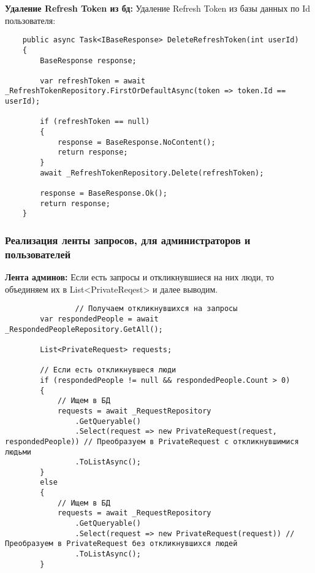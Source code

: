 \textbf{Удаление Refresh Token из бд:} Удаление Refresh Token из базы данных по Id пользователя:
\begin{verbatim}
    public async Task<IBaseResponse> DeleteRefreshToken(int userId)
    {
        BaseResponse response;

        var refreshToken = await _RefreshTokenRepository.FirstOrDefaultAsync(token => token.Id == userId);

        if (refreshToken == null)
        {
            response = BaseResponse.NoContent();
            return response;
        }
        await _RefreshTokenRepository.Delete(refreshToken);

        response = BaseResponse.Ok();
        return response;
    }
\end{verbatim}

\subsubsection{Реализация ленты запросов, для администраторов и пользователей}

\textbf{Лента админов:} Если есть запросы и откликнувшиеся на них люди, то объединяем их в List<PrivateReqest> и далее выводим.
\begin{verbatim}
				// Получаем откликнувшихся на запросы
        var respondedPeople = await _RespondedPeopleRepository.GetAll();

        List<PrivateRequest> requests;

        // Если есть откликнувшеся люди
        if (respondedPeople != null && respondedPeople.Count > 0)
        {
            // Ищем в БД
            requests = await _RequestRepository
                .GetQueryable()
                .Select(request => new PrivateRequest(request, respondedPeople)) // Преобразуем в PrivateRequest с откликнувшимися людьми
                .ToListAsync();
        }
        else
        {
            // Ищем в БД
            requests = await _RequestRepository
                .GetQueryable()
                .Select(request => new PrivateRequest(request)) // Преобразуем в PrivateRequest без откликнувшихся людей
                .ToListAsync();
        }
\end{verbatim}

